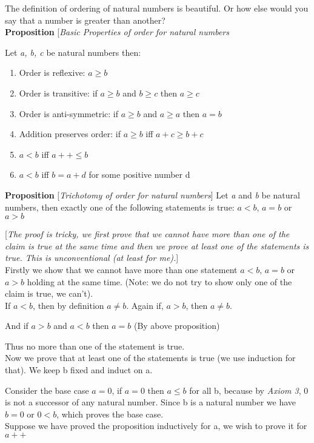 \documentclass[10pt]{article}
\begin{document}
  The definition of ordering of natural numbers is beautiful. Or how else would
  you say that a number is greater than another?
\\[6pt]
\textbf{Proposition} [\emph{Basic Properties of order for natural numbers}

  Let \emph{a, b, c} be natural numbers then:

  \begin{enumerate}
  \item Order is reflexive: $a \geq b$
  \item Order is transitive: if $a \geq b$ and $b \geq c$ then $a \geq c$
  \item Order is anti-symmetric: if $a \geq b$ and $a \geq a$ then $a=b$
  \item Addition preserves order: if $a \geq b$ iff $a+c \geq b+c$
  \item $a < b$ iff $a++ \leq b$
  \item $a < b$ iff $b=a+d$ for some positive number d
  \end{enumerate}

\flushleft
\textbf{Proposition} [\emph{Trichotomy of order for natural numbers}]
Let {\em a} and {\em b} be natural numbers, then exactly one of the following
statements is true: $a < b$, $a = b$ or $a > b$

[\emph{The proof is tricky, we first prove that we cannot have more than one of
    the claim is true at the same time and then we prove at least one of the
    statements is true. This is unconventional (at least for me).}]
\\[5pt]
Firstly we show that we cannot have more than one statement $a < b$, $a = b$
or $a > b$ holding at the same time. (Note: we do not try to show only one of
the claim is true, we can't).
\\[3pt]
If $a < b$, then by definition $a \ne b$. Again if, $a > b$, then $a \ne b$.

And if $a>b$ and $a<b$ then $a = b$ (By above proposition)

Thus no more than one of the statement is true.
\\[4pt]
Now we prove that at least one of the statements is true (we use induction for
that). We keep b fixed and induct on a.

Consider the base case $a = 0$, if $a=0$ then $a \leq b$ for all b, because by
\emph{Axiom 3}, 0 is not a successor of any natural number. Since b is a natural
number we have $b=0$ or $0<b$, which proves the base case.
\\[4pt]
Suppose we have proved the proposition inductively for a, we wish to prove it
for $a++$
\end{document}
